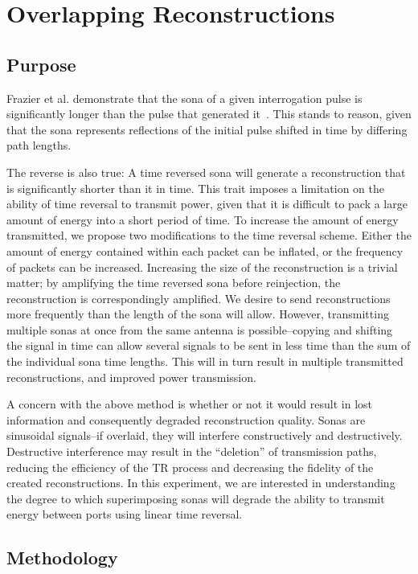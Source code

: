 \section{Overlapping Reconstructions}
\label{sec:overlapping}

\subsection{Purpose}

Frazier et al. demonstrate that the sona of a given interrogation pulse is significantly longer than the pulse that generated it~\cite{nltr-wave-chaotic}. This stands to reason, given that the sona represents reflections of the initial pulse shifted in time by differing path lengths.

The reverse is also true: A time reversed sona will generate a reconstruction that is significantly shorter than it in time. This trait imposes a limitation on the ability of time reversal to transmit power, given that it is difficult to pack a large amount of energy into a short period of time. To increase the amount of energy transmitted, we propose two modifications to the time reversal scheme. Either the amount of energy contained within each packet can be inflated, or the frequency of packets can be increased. Increasing the size of the reconstruction is a trivial matter; by amplifying the time reversed sona before reinjection, the reconstruction is correspondingly amplified. We desire to send reconstructions more frequently than the length of the sona will allow. However, transmitting multiple sonas at once from the same antenna is possible--copying and shifting the signal in time can allow several signals to be sent in less time than the sum of the individual sona time lengths. This will in turn result in multiple transmitted reconstructions, and improved power transmission.

A concern with the above method is whether or not it would result in lost information and consequently degraded reconstruction quality. Sonas are sinusoidal signals--if overlaid, they will interfere constructively and destructively. Destructive interference may result in the ``deletion'' of transmission paths, reducing the efficiency of the TR process and decreasing the fidelity of the created reconstructions. In this experiment, we are interested in understanding the degree to which superimposing sonas will degrade the ability to transmit energy between ports using linear time reversal.

\subsection{Methodology}

